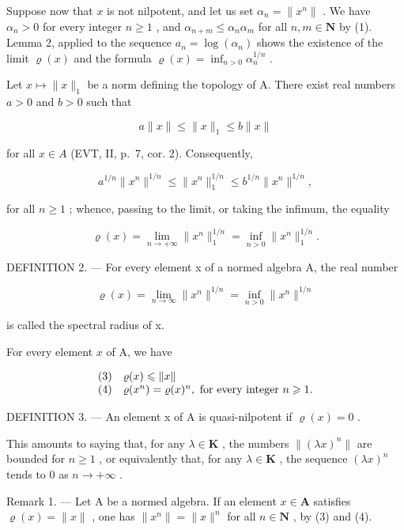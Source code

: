 Suppose now that \(x\) is not nilpotent, and let us set \(\alpha_{n} = \| x^{n}\|\) . We have \(\alpha_{n} > 0\) for every integer \(n \geqslant 1\) , and \(\alpha_{n + m} \leqslant \alpha_{n}\alpha_{m}\) for all \(n, m \in \mathbf{N}\) by (1). Lemma 2, applied to the sequence \(a_n = \log(\alpha_n)\) shows the existence of the limit \(\varrho(x)\) and the formula \(\varrho(x) = \inf_{n > 0} \alpha_n^{1/n}\) .

Let \(x \mapsto \|x\|_1\) be a norm defining the topology of A. There exist real numbers \(a > 0\) and \(b > 0\) such that

\[
a \| x \| \leqslant \| x \| _ {1} \leqslant b \| x \|
\]

for all \(x \in A\) (EVT, II, p.~7, cor. 2). Consequently,

\[
a ^ {1 / n} \| x ^ {n} \| ^ {1 / n} \leqslant \| x ^ {n} \| _ {1} ^ {1 / n} \leqslant b ^ {1 / n} \| x ^ {n} \| ^ {1 / n},
\]

for all \(n \geqslant 1\) ; whence, passing to the limit, or taking the infimum, the equality

\[
\varrho (x) = \lim _ {n \to + \infty} \| x ^ {n} \| _ {1} ^ {1 / n} = \inf _ {n > 0} \| x ^ {n} \| _ {1} ^ {1 / n}.
\]

DEFINITION 2. --- For every element x of a normed algebra A, the real number

\[
\varrho (x) = \lim _ {n \to \infty} \| x ^ {n} \| ^ {1 / n} = \inf _ {n > 0} \| x ^ {n} \| ^ {1 / n}
\]

is called the spectral radius of x.

For every element \(x\) of A, we have

\[
\begin{array}{r l} (3) & \varrho (x) \leqslant \| x \| \\ (4) & \varrho (x ^ {n}) = \varrho (x) ^ {n}, \text { for every integer } n \geqslant 1. \end{array}
\]

DEFINITION 3. --- An element x of A is quasi-nilpotent if \(\varrho(x)=0\) .

This amounts to saying that, for any \(\lambda \in \mathbf{K}\) , the numbers \(\| (\lambda x)^n\|\) are bounded for \(n\geqslant 1\) , or equivalently that, for any \(\lambda \in \mathbf{K}\) , the sequence \((\lambda x)^n\) tends to 0 as \(n\to +\infty\) .

Remark 1. --- Let A be a normed algebra. If an element \(x \in \mathbf{A}\) satisfies \(\varrho(x) = \|x\|\) , one has \(\|x^n\| = \|x\|^n\) for all \(n \in \mathbf{N}\) , by (3) and (4).

